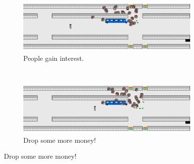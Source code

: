 \documentclass[a4paper,pdf,12pt]{article}
\begin{document}
\begin{figure}
        \begin{subfigure}[b]{0.4\textwidth}
                \centering
                \includegraphics[width=\textwidth]{../screenshots/screenshot_18178.png}
                \caption{People gain interest.}
                \label{fig:screenshot03}
        \end{subfigure}
        ~ %
        \begin{subfigure}[b]{0.4\textwidth}
                \centering
                \includegraphics[width=\textwidth]{../screenshots/screenshot_23227.png}
                \caption{Drop some more money!}
                \label{fig:screenshot04}
        \end{subfigure}


\end{figure}
\end{document}
